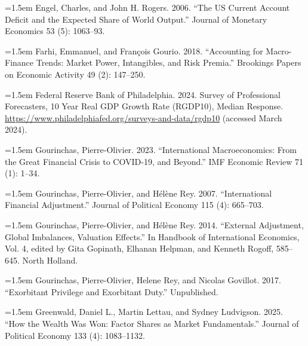 \documentclass[11pt]{article}
\begin{document}
\noindent\hangindent=1.5em Engel, Charles, and John H. Rogers. 2006. “The US Current Account Deficit and the Expected Share of World Output.” Journal of Monetary Economics 53 (5): 1063–93.\par

\noindent\hangindent=1.5em Farhi, Emmanuel, and François Gourio. 2018. “Accounting for Macro-Finance Trends: Market Power, Intangibles, and Risk Premia.” Brookings Papers on Economic Activity 49 (2): 147–250.\par

\noindent\hangindent=1.5em Federal Reserve Bank of Philadelphia. 2024. Survey of Professional Forecasters, 10 Year Real GDP Growth Rate (RGDP10), Median Response. \url{https://www.philadelphiafed.org/surveys-and-data/rgdp10} (accessed March 2024).\par

\noindent\hangindent=1.5em Gourinchas, Pierre-Olivier. 2023. “International Macroeconomics: From the Great Financial Crisis to COVID-19, and Beyond.” IMF Economic Review 71 (1): 1–34.\par

\noindent\hangindent=1.5em Gourinchas, Pierre-Olivier, and Hélène Rey. 2007. “International Financial Adjustment.” Journal of Political Economy 115 (4): 665–703.\par

\noindent\hangindent=1.5em Gourinchas, Pierre-Olivier, and Hélène Rey. 2014. “External Adjustment, Global Imbalances, Valuation Effects.” In Handbook of International Economics, Vol. 4, edited by Gita Gopinath, Elhanan Helpman, and Kenneth Rogoff, 585–645. North Holland.\par

\noindent\hangindent=1.5em Gourinchas, Pierre-Olivier, Helene Rey, and Nicolas Govillot. 2017. “Exorbitant Privilege and Exorbitant Duty.” Unpublished.\par

\noindent\hangindent=1.5em Greenwald, Daniel L., Martin Lettau, and Sydney Ludvigson. 2025. “How the Wealth Was Won: Factor Shares as Market Fundamentals.” Journal of Political Economy 133 (4): 1083–1132.\par
\end{document}
